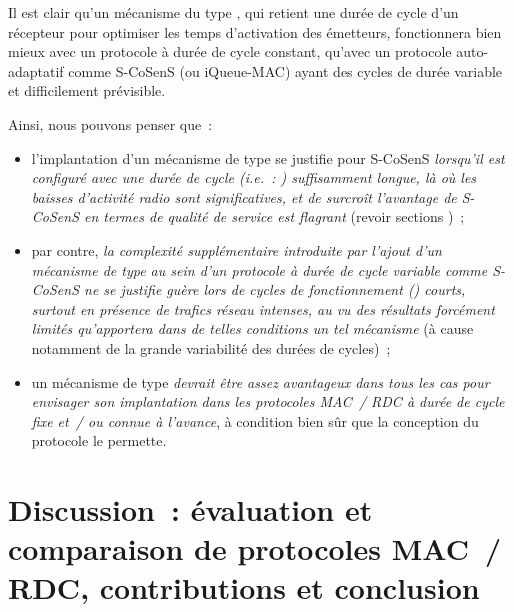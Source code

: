 Il est clair qu'un mécanisme du type , qui retient
une durée de cycle d'un récepteur pour optimiser les temps d'activation
des émetteurs, fonctionnera bien mieux avec un protocole à durée de cycle
constant, qu'avec un protocole auto-adaptatif comme S-CoSenS (ou iQueue-MAC)
ayant des cycles de durée variable et difficilement prévisible.

\medskip

Ainsi, nous pouvons penser que~:

\begin{itemize}

\item l'implantation d'un mécanisme de type  se
justifie pour S-CoSenS \emph{lorsqu'il est configuré avec une durée de
cycle (i.e.~: ) suffisamment longue, là où les baisses
d'activité radio sont significatives, et de surcroît l'avantage de S-CoSenS
en termes de qualité de service est flagrant} (revoir sections
)~;

\item par contre, \emph{la complexité supplémentaire introduite par l'ajout
d'un mécanisme de type  au sein d'un protocole à durée
de cycle variable comme S-CoSenS ne se justifie guère lors de cycles
de fonctionnement () courts, surtout en présence de
trafics réseau intenses, au vu des résultats forcément limités qu'apportera
dans de telles conditions un tel mécanisme} (à cause notamment de la grande
variabilité des durées de cycles)~;

\item un mécanisme de type  \emph{devrait être assez
avantageux dans tous les cas pour envisager son implantation dans les
protocoles MAC~/ RDC à durée de cycle fixe et~/ ou connue à l'avance},
à condition bien sûr que la conception du protocole le permette.

\end{itemize}


\section[Discussion~: évaluation et comparaison de protocoles MAC~/ RDC,
         contributions et conclusion]
        {Discussion~: évaluation et comparaison de protocoles MAC~/ RDC,
         contributions et conclusion%
         }
\label{SecDiscussContribConcluProtocolesMAC}

